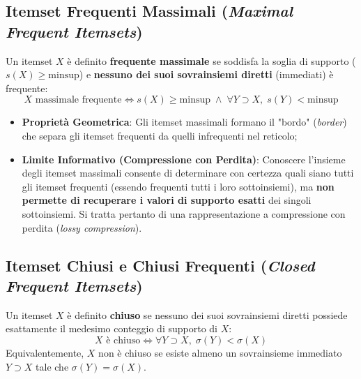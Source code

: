 \FloatBarrier
\subsection{Itemset Frequenti Massimali (\textit{Maximal Frequent Itemsets})}

\begin{definition}
Un itemset $X$ è definito \textbf{frequente massimale} se soddisfa la soglia di supporto ($s(X) \ge \mathrm{minsup}$) e \textbf{nessuno dei suoi sovrainsiemi diretti} (immediati) è frequente:
\begin{equation}
\label{eq:dm-maximal-frequent-def}
X \text{ massimale frequente} \iff s(X) \ge \mathrm{minsup} \;\land\; \forall Y \supset X, \; s(Y) < \mathrm{minsup}
\end{equation}
\end{definition}

\begin{itemize}
    \item \textbf{Proprietà Geometrica}: Gli itemset massimali formano il "bordo" (\textit{border}) che separa gli itemset frequenti da quelli infrequenti nel reticolo;
    \item \textbf{Limite Informativo (Compressione con Perdita)}: Conoscere l'insieme degli itemset massimali consente di determinare con certezza quali siano tutti gli itemset frequenti (essendo frequenti tutti i loro sottoinsiemi), ma \textbf{non permette di recuperare i valori di supporto esatti} dei singoli sottoinsiemi. Si tratta pertanto di una rappresentazione a compressione con perdita (\textit{lossy compression}).
\end{itemize}

\FloatBarrier
\subsection{Itemset Chiusi e Chiusi Frequenti (\textit{Closed Frequent Itemsets})}

\begin{definition}
Un itemset $X$ è definito \textbf{chiuso} se nessuno dei suoi sovrainsiemi diretti possiede esattamente il medesimo conteggio di supporto di $X$:
\begin{equation}
\label{eq:dm-closed-itemset-def}
X \text{ è chiuso} \Longleftrightarrow \forall Y \supset X, \; \sigma(Y) < \sigma(X)
\end{equation}
Equivalentemente, $X$ non è chiuso se esiste almeno un sovrainsieme immediato $Y \supset X$ tale che $\sigma(Y) = \sigma(X)$.
\end{definition}

